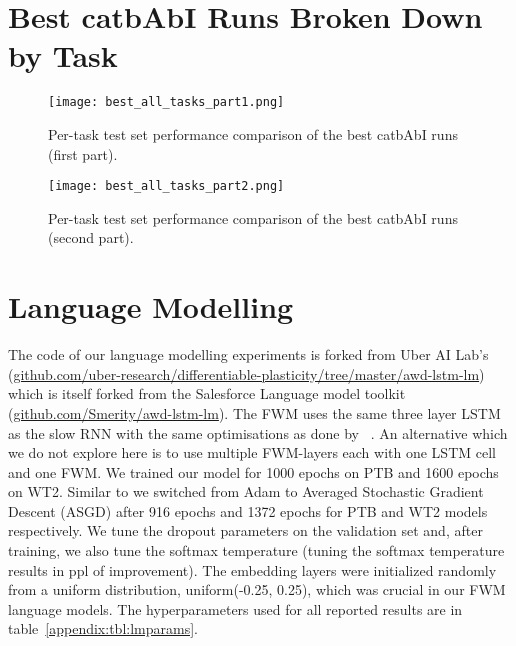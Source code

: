 \documentclass{article} \usepackage{iclr2021_conference,times}
\begin{document}
\section{Best catbAbI Runs Broken Down by Task}
\begin{figure}[H]
  \centering
  \vspace{-10pt}
  \texttt{[image: best\_all\_tasks\_part1.png]}
  \vspace{-10pt}
  \caption{Per-task test set performance comparison of the best catbAbI runs (first part).}
  \label{appendix:fig:best_all_tasks}
\end{figure}
\begin{figure}[H]
  \centering
  \vspace{-10pt}
  \texttt{[image: best\_all\_tasks\_part2.png]}
  \vspace{-10pt}
  \caption{Per-task test set performance comparison of the best catbAbI runs (second part).}
  \label{appendix:fig:best_all_tasks_part2}
\end{figure}

\newpage
\section{Language Modelling}
\label{appendix:sec:LM}
The code of our language modelling experiments is forked from Uber AI Lab's (\href{https://github.com/uber-research/differentiable-plasticity/tree/master/awd-lstm-lm}{github.com/uber-research/differentiable-plasticity/tree/master/awd-lstm-lm}) which is itself forked from the Salesforce Language model toolkit (\href{https://github.com/Smerity/awd-lstm-lm}{github.com/Smerity/awd-lstm-lm}). The FWM uses the same three layer LSTM as the slow RNN with the same optimisations as done by ~\citet{merity2018regularizing}.
An alternative which we do not explore here is to use multiple FWM-layers each with one LSTM cell and one FWM.
We trained our model for 1000 epochs on PTB and 1600 epochs on WT2. 
Similar to \citet{merity2018regularizing} we switched from Adam to Averaged Stochastic Gradient Descent (ASGD) after 916 epochs and 1372 epochs for PTB and WT2 models respectively.
We tune the dropout parameters on the validation set and, after training, we also tune the softmax temperature (tuning the softmax temperature results in  ppl of improvement). 
The embedding layers were initialized randomly from a uniform distribution, uniform(-0.25, 0.25), which was crucial in our FWM language models. 
The hyperparameters used for all reported results are in table~\ref{appendix:tbl:lmparams}.
\end{document}
